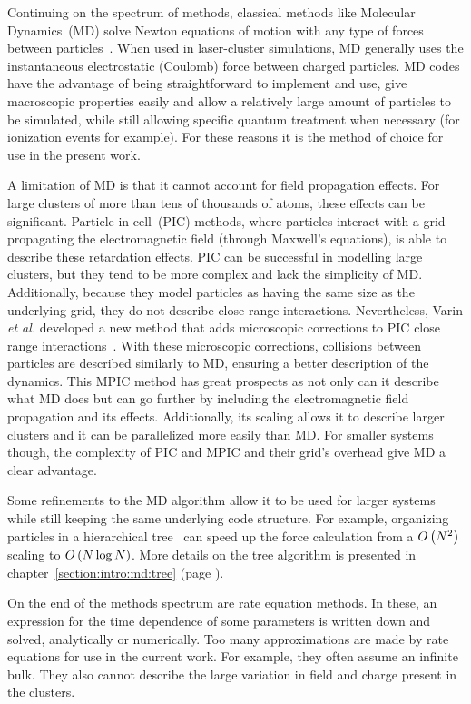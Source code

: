 Continuing on the spectrum of methods, classical methods like Molecular
Dynamics~(MD) solve Newton
equations of motion with any type of forces between particles~\cite{Skeel1998}.
When used in
laser-cluster simulations, MD generally uses the instantaneous electrostatic
(Coulomb) force between charged particles. MD codes have the advantage of being
straightforward to implement and use, give macroscopic properties easily and allow a
relatively large amount of particles to be simulated, while still allowing
specific quantum treatment when necessary (for ionization events for example). For
these reasons it is the method of choice for use in the present work.

A limitation of MD is that it cannot account for field propagation effects. For
large clusters of more than tens of thousands of atoms, these effects can be
significant. Particle-in-cell~(PIC) methods, where particles interact with a grid propagating the
electromagnetic field (through Maxwell's equations),
is able to describe these retardation effects. PIC can be successful in
modelling large clusters, but they tend to be more complex and lack the
simplicity of MD. Additionally, because they model particles as having the same
size as the underlying grid, they do not describe close range interactions.
Nevertheless, Varin \textit{et al.} developed a new method that adds microscopic
corrections to PIC close range interactions~\cite{Varin2012}. With these microscopic
corrections, collisions between particles are described similarly to MD, ensuring
a better description of the dynamics. This MPIC method has great prospects
as not only can it describe what MD does but can go further by including the
electromagnetic field propagation and its effects. Additionally, its scaling
allows it to describe larger clusters and it can be parallelized more easily
than MD. For smaller systems though, the complexity of PIC and MPIC and their
grid's overhead give MD a clear advantage.

Some refinements to the MD algorithm allow it to be used for larger systems
while still keeping the same underlying code structure. For example, organizing
particles in a hierarchical tree~\cite{Barnes1986,Gibbon2002} can speed up the force
calculation from a $O\left( N^2 \right)$ scaling to $O\left( N \log{N} \right)$. More details on the
tree algorithm is presented in chapter~\ref{section:intro:md:tree} (page
\pageref{section:intro:md:tree}).

On the end of the methods spectrum are rate equation methods. In these, an
expression for the time dependence of some parameters is written down and solved,
analytically or numerically. Too many approximations
are made by rate equations for use in the current work. For example, they often
assume an infinite bulk. They also cannot describe the large variation in field
and charge present in the clusters.

